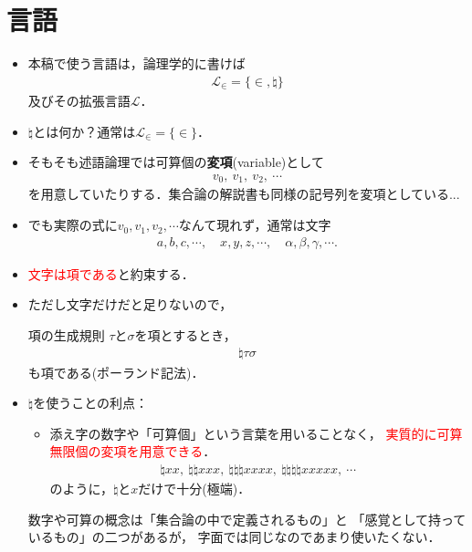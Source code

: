 \section{言語}
	\begin{itemize}
		\item 本稿で使う言語は，論理学的に書けば
			\begin{align}
				\mathcal{L}_{\in} = \{\in,\natural\}
			\end{align}
			及びその拡張言語$\mathcal{L}$．
			
		\item $\natural$とは何か？通常は$\mathcal{L}_{\in} = \{\in\}$．
		
		\item そもそも述語論理では可算個の{\bf 変項}{(variable)}として
			\begin{align}
				v_{0},\ v_{1},\ v_{2},\ \cdots
			\end{align}
			を用意していたりする．集合論の解説書も同様の記号列を変項としている...
			
\newpage
		\item でも実際の式に$v_{0},v_{1},v_{2},\cdots$なんて現れず，通常は文字
			\begin{align}
				a,b,c,\cdots, \quad x,y,z,\cdots, \quad \alpha,\beta,\gamma,\cdots.
			\end{align}
		
		\item \textcolor{red}{文字は項である}と約束する．
			
		\item ただし文字だけだと足りないので，
			
			\begin{itembox}[l]{項の生成規則}
				$\tau$と$\sigma$を項とするとき，
				\begin{align}
					\natural \tau \sigma
				\end{align}
				も項である(ポーランド記法)．
			\end{itembox}
	
\newpage
		\item $\natural$を使うことの利点：
			\begin{itemize}
				\item 添え字の数字や「可算個」という言葉を用いることなく，
					\textcolor{red}{実質的に可算無限個の変項を用意できる}．
					\begin{align}
						\natural xx,\ \natural \natural xxx,\ \natural \natural \natural xxxx,\ 
						\natural \natural \natural \natural xxxxx,\ \cdots
					\end{align}
					のように，$\natural$と$x$だけで十分(極端)． 
			\end{itemize}
			
			数字や可算の概念は「集合論の中で定義されるもの」と
			「感覚として持っているもの」の二つがあるが，
			字面では同じなのであまり使いたくない．
	\end{itemize}

